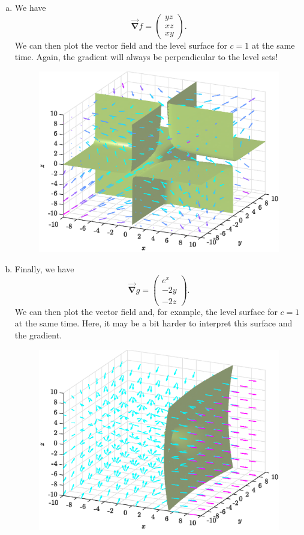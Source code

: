 \documentclass[12pt]{article} %
\newcommand{\grad}{\boldsymbol{\vec{\nabla}}}
\begin{document}
\begin{solution}
\begin{enumerate}[(a)]
\begin{figure}[H]
    \end{figure}
    \item We have
    \[
    \grad f = \begin{pmatrix} yz \\ xz \\ xy \end{pmatrix}.
    \]
    We can then plot the vector field and the level surface for $c=1$ at the same time. Again, the gradient will always be perpendicular to the level sets!
    \begin{figure}[H]
        \centering
        \includegraphics[width=.65\textwidth]{figures/1b}
    \end{figure}
    \item Finally, we have
    \[
    \grad g = \begin{pmatrix} e^x \\ -2y \\ -2z \end{pmatrix}.
    \]
    We can then plot the vector field and, for example, the level surface for $c=1$ at the same time. Here, it may be a bit harder to interpret this surface and the gradient.
    \begin{figure}[H]
        \centering
        \includegraphics[width=.65\textwidth]{figures/1c}
    \end{figure}

\end{enumerate}
\end{solution}
\end{document}

